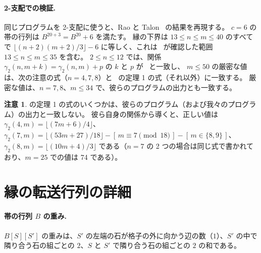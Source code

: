 \documentclass[11pt]{ltjsarticle}
\theoremstyle{definition}
\newtheorem{remark}[theorem]{注意}
\newcommand{\iv}[1]{[\,#1\,]}
\begin{document}
\paragraph{2-支配での検証.}
同じプログラムを 2-支配に使うと、Rao と Talon~\cite{RT} の結果を再現する。
$c=6$ の帯の行列は $B^{20+3}=B^{20}+6$ を満たす。
縁の下界は $13\le n\le m\le 40$ のすべてで $\lfloor (n+2)(m+2)/3\rfloor-6$ に等しく、これは~\cite{RT} が確認した範囲 $13\le n\le m\le 35$ を含む。
$2\le n\le 12$ では、関係 $\gamma_2(n,m+k)=\gamma_2(n,m)+p$ の $k$ と $p$ が~\cite{RT} と一致し、
$m\le 50$ の厳密な値は、次の注意の式（$n=4,7,8$）と~\cite{RT} の定理 1 の式（それ以外）に一致する。
厳密な値は、$n=7,8$、$m\le 34$ で、彼らのプログラムの出力とも一致する。

\begin{remark}
\cite{RT} の定理 1 の式のいくつかは、彼らのプログラム（および我々のプログラム）の出力と一致しない。
彼ら自身の関係から導くと、正しい値は
$\gamma_2(4,m)=\lfloor (7m+6)/4\rfloor$、
$\gamma_2(7,m)=\lfloor (53m+27)/18\rfloor-\iv{m\equiv 7 \pmod{18}}-\iv{m\in\{8,9\}}$、
$\gamma_2(8,m)=\lfloor (10m+4)/3\rfloor$
である（$n=7$ の 2 つの場合は同じ式で書かれており、$m=25$ での値は 74 である）。
\end{remark}

\appendix
\section{縁の転送行列の詳細}\label{app:border}

\paragraph{帯の行列 $B$ の重み.}
$B[S][S']$ の重みは、$S'$ の左端の石が格子の外に向かう辺の数（$1$）、$S'$ の中で隣り合う石の組ごとの $2$、$S$ と $S'$ で隣り合う石の組ごとの $2$ の和である。
\end{document}
